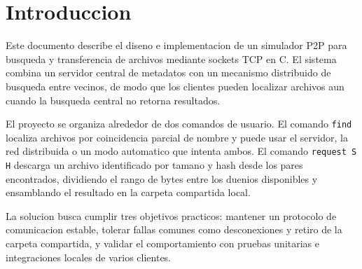 \section{Introduccion}

Este documento describe el diseno e implementacion de un simulador P2P para
busqueda y transferencia de archivos mediante sockets TCP en C. El sistema
combina un servidor central de metadatos con un mecanismo distribuido de
busqueda entre vecinos, de modo que los clientes pueden localizar archivos aun
cuando la busqueda central no retorna resultados.

El proyecto se organiza alrededor de dos comandos de usuario. El comando
\texttt{find} localiza archivos por coincidencia parcial de nombre y puede
usar el servidor, la red distribuida o un modo automatico que intenta ambos. El
comando \texttt{request S H} descarga un archivo identificado por tamano y hash
desde los pares encontrados, dividiendo el rango de bytes entre los duenios
disponibles y ensamblando el resultado en la carpeta compartida local.

La solucion busca cumplir tres objetivos practicos: mantener un protocolo de
comunicacion estable, tolerar fallas comunes como desconexiones y retiro de la
carpeta compartida, y validar el comportamiento con pruebas unitarias e
integraciones locales de varios clientes.

